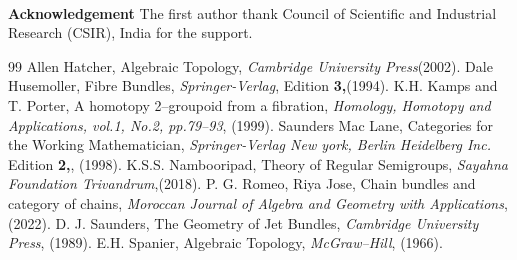 \documentclass{amsart}
\theoremstyle{plain}
\begin{document}
\\
  \textbf{Acknowledgement}
  The first author thank Council of Scientific and Industrial Research (CSIR), India for the support.
  
	\begin{thebibliography}{99}
		 Allen Hatcher, {Algebraic Topology},  {\small \it Cambridge University Press}(2002).
		 Dale Husemoller, {Fibre Bundles},  {\small \it Springer-Verlag}, {Edition \small \bf 3,}(1994).
		 K.H. Kamps and T. Porter, {A homotopy 2–groupoid from a fibration}, {\small \it Homology, Homotopy and Applications, vol.1, No.2, pp.79–93}, (1999).
		 Saunders Mac Lane, {Categories for the Working Mathematician}, {\small \it Springer-Verlag New york, Berlin Heidelberg Inc.}  {Edition \small \bf 2,}, (1998).
		 K.S.S. Nambooripad, {Theory of Regular Semigroups}, {\small \it Sayahna Foundation Trivandrum},(2018).
		 P. G. Romeo, Riya Jose, {Chain bundles and category of chains}, {\small \it Moroccan Journal of Algebra and Geometry with Applications}, (2022).
		 D. J. Saunders, {The Geometry of Jet Bundles}, {\small \it Cambridge University Press}, (1989).
		  E.H. Spanier, {Algebraic Topology}, {\small \it McGraw–Hill}, (1966).
	\end{thebibliography}
	
\end{document}
